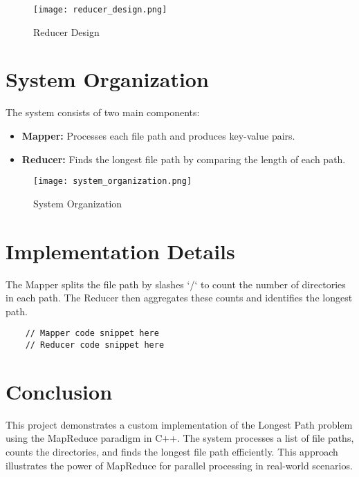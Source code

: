 \documentclass{article}
\begin{document}
\begin{figure}[h!]
\centering
\texttt{[image: reducer\_design.png]}
\caption{Reducer Design}
\end{figure}

\section{System Organization}
The system consists of two main components:
\begin{itemize}
    \item \textbf{Mapper:} Processes each file path and produces key-value pairs.
    \item \textbf{Reducer:} Finds the longest file path by comparing the length of each path.
\end{itemize}

\begin{figure}[h!]
\centering
\texttt{[image: system\_organization.png]}
\caption{System Organization}
\end{figure}

\section{Implementation Details}
The Mapper splits the file path by slashes `/` to count the number of directories in each path. The Reducer then aggregates these counts and identifies the longest path.

\begin{verbatim}
    // Mapper code snippet here
    // Reducer code snippet here
\end{verbatim}

\section{Conclusion}
This project demonstrates a custom implementation of the Longest Path problem using the MapReduce paradigm in C++. The system processes a list of file paths, counts the directories, and finds the longest file path efficiently. This approach illustrates the power of MapReduce for parallel processing in real-world scenarios.
\end{document}
